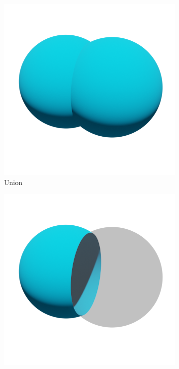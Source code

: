 \begin{figure}
	\centering
	\begin{subfigure}[t]{0.3\textwidth}
		\centering
		\includegraphics[width=\textwidth]{Images/Union}
		\caption{Union}
	\end{subfigure}
	\hfill
	\begin{subfigure}[t]{0.3\textwidth}
		\centering
		\includegraphics[width=\textwidth]{Images/Subtract}

\end{subfigure}
\end{figure}
